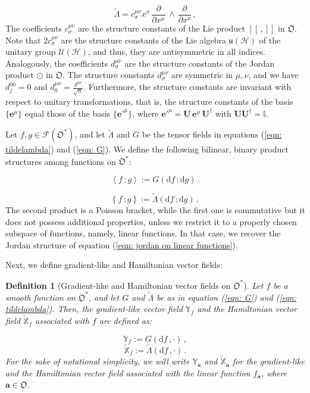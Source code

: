 \documentclass[11pt]{article}
\newcommand{\be}{\begin{equation}}
\newcommand{\ee}{\end{equation}}
\newcommand{\vsp}{\vspace{0.4cm}}
\newcommand{\obsp}{\mathfrak{O}}
\newtheorem{defn}{Definition}
\begin{document}
\be\label{eqn: tildelambda}
\widetilde{\Lambda} = c^{\mu\nu}_{\sigma}x^{\sigma}\,\frac{\partial}{\partial x^{\mu}}\,\wedge\,\frac{\partial}{\partial x^{\nu}}\,,
\ee
The coefficients $c^{\mu\nu}_{\sigma}$ are the structure constants of the Lie product $[[\,,]]$ in $\obsp$.
Note that $2c^{\mu\nu}_{\sigma}$ are the structure constants of the Lie algebra $\mathfrak{u}(\mathcal{H})$ of the unitary group $\mathcal{U}(\mathcal{H})$, and thus, they are  antisymmetric in all indices.
Analogously, the coefficients $d^{\mu\nu}_{\sigma}$ are   the structure constants of the Jordan product $\odot$ in $\obsp$.
The structure constants $d^{\mu\nu}_{\sigma}$ are  symmetric in $\mu,\nu$, and we have $d^{0 0}_{j}=0$ and $d^{\mu\nu}_{0}=\frac{\delta^{\mu\nu}}{\sqrt{n}}$.
Furthermore,  the structure constants are invariant with respect to unitary transformations, that is, the structure constants of the basis $\{\mathbf{e}^{\mu}\}$ equal those of the basis $\{\mathbf{e}'^{\mu}\}$, where $\mathbf{e}'^{\mu}=\mathbf{U}\,\mathbf{e}^{\mu}\,\mathbf{U}^{\dagger}$ with $\mathbf{U}\mathbf{U}^{\dagger}=\mathbb{I}$.

Let $f,g\in\mathcal{F}(\obsp^{*})$, and let $\widetilde{\Lambda}$ and $G$ be the tensor fields in equations (\ref{eqn: tildelambda}) and (\ref{eqn: G}).
We define the following bilinear, binary product structures among functions on $\obsp^{*}$:

\be
\left\langle f\,;g\right\rangle:=G\left(\mathrm{d}f\,;\mathrm{d}g\right)\,.
\ee

\be
\left\{f\,;g\right\}:=\widetilde{\Lambda}\left(\mathrm{d}f\,;\mathrm{d}g\right)\,,
\ee
The second product is a Poisson bracket, while the first one is commutative but it does not possess additional properties, unless we restrict  it to a properly chosen subspace of functions, namely, linear functions.
In that case, we recover the Jordan structure of equation (\ref{eqn: jordan on linear functions}).

\vsp

Next, we define gradient-like and Hamiltonian vector fields:



\begin{defn}[Gradient-like and Hamiltonian vector fields on $\obsp^{*}$]\label{Gradient-like and Hamiltonian vector fields on the dual}
Let $f$ be a smooth function on $\obsp^{*}$, and let $G$ and $\widetilde{\Lambda}$ be as in equation (\ref{eqn: G}) and (\ref{eqn: tildelambda}).
Then, the gradient-like vector field $\mathbb{Y}_{f}$ and the Hamiltonian vector field $\widetilde{\mathbb{X}}_{f}$ associated with $f$ are defined as:

\be\label{eqn: gradient-like vector fields}
\mathbb{Y}_{f}:=G(\mathrm{d}f\,,\cdot)\,,
\ee
\be\label{eqn: hamiltonian vector fields}
\widetilde{\mathbb{X}}_{f}:=\widetilde{\Lambda}(\mathrm{d}f\,,\cdot)\,.
\ee
For the sake of notational simplicity, we will write $\mathbb{Y}_{\mathbf{a}}$ and $\widetilde{\mathbb{X}}_{\mathbf{a}}$ for the gradient-like and the Hamiltonian vector field associated with the linear function $f_{\mathbf{a}}$, where $\mathbf{a}\in\obsp$.
\end{defn}
\end{document}
